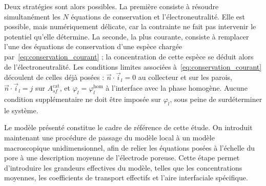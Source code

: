 Deux stratégies sont alors possibles. La première consiste à résoudre
simultanément les $N$ équations de conservation et
l'électroneutralité. Elle est possible, mais numériquement délicate, car la
contrainte ne fait pas intervenir le potentiel qu'elle détermine. La seconde,
la plus courante, consiste à remplacer l'une des équations de conservation
d'une espèce chargée par~\eqref{eq:conservation_courant} ; la concentration de
cette espèce se déduit alors de l'électroneutralité. Les conditions limites
associées à~\eqref{eq:conservation_courant} découlent de celles déjà
posées : $\vec{n}\cdot\vec{i}_l = 0$ au collecteur et sur les parois,
$\vec{n}\cdot\vec{i}_l = j$ sur $A_{sf}^{\mathrm{cat}}$, et
$\varphi_l = \varphi_l^{\mathrm{hom}}$ à l'interface avec la phase homogène.
Aucune condition supplémentaire ne doit être imposée sur $\varphi_l$, sous
peine de surdéterminer le système.


Le modèle présenté constitue le cadre de référence de cette étude.
On introduit maintenant une procédure de passage du modèle local à un modèle
macroscopique unidimensionnel, afin de relier les équations posées à l'échelle
du pore à une description moyenne de l'électrode poreuse. Cette étape permet
d'introduire les grandeurs effectives du modèle, telles que les concentrations
moyennes, les coefficients de transport effectifs et l'aire interfaciale
spécifique.